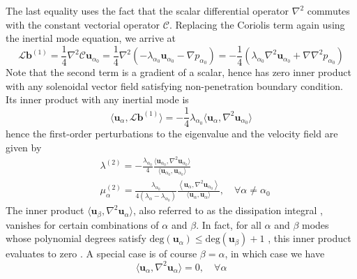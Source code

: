 %
The last equality uses the fact that the scalar differential operator $\nabla^2$ commutes with the constant vectorial operator $\mathcal{C}$. Replacing the Coriolis term again using the inertial mode equation, we arrive at
%
\begin{equation}\label{eqn:Lorentz-order1-ideal}
    \mathcal{L} \mathbf{b}^{(1)} = \frac{1}{4} \nabla^2 \mathcal{C} \mathbf{u}_{\alpha_0} = \frac{1}{4} \nabla^2 \left(- \lambda_{\alpha_0} \mathbf{u}_{\alpha_0} - \nabla p_{\alpha_0}\right) = - \frac{1}{4} \left(\lambda_{\alpha_0} \nabla^2 \mathbf{u}_{\alpha_0} + \nabla \nabla^2 p_{\alpha_0}\right)
\end{equation}
%
Note that the second term is a gradient of a scalar, hence has zero inner product with any solenoidal vector field satisfying non-penetration boundary condition. Its inner product with any inertial mode is
%
\begin{equation}
    \langle \mathbf{u}_{\alpha}, \mathcal{L} \mathbf{b}^{(1)} \rangle = - \frac{1}{4} \lambda_{\alpha_0} \langle  \mathbf{u}_{\alpha}, \nabla^2 \mathbf{u}_{\alpha_0} \rangle
\end{equation}
%
hence the first-order perturbations to the eigenvalue and the velocity field are given by
%
\begin{align}
    &\lambda^{(2)} = -\frac{\lambda_{\alpha_0}}{4} \frac{\langle \mathbf{u}_{\alpha_0}, \nabla^2 \mathbf{u}_{\alpha_0} \rangle}{\langle \mathbf{u}_{\alpha_0}, \mathbf{u}_{\alpha_0} \rangle}
    \\
    &\mu_\alpha^{(2)} = \frac{\lambda_{\alpha_0}}{4(\lambda_\alpha - \lambda_{\alpha_0})} \frac{\left\langle \mathbf{u}_{\alpha}, \nabla^2 \mathbf{u}_{\alpha_0} \right\rangle}{\langle \mathbf{u}_{\alpha}, \mathbf{u}_{\alpha} \rangle},\quad \forall \alpha \neq \alpha_0
\end{align}
%
The inner product $\langle \mathbf{u}_\beta, \nabla^2 \mathbf{u}_\alpha \rangle$, also referred to as the dissipation integral \citep{zhang_theory_2017}, vanishes for certain combinations of $\alpha$ and $\beta$. In fact, for all $\alpha$ and $\beta$ modes whose polynomial degrees satisfy $\mathrm{deg} (\mathbf{u}_\alpha) \leq \mathrm{deg} (\mathbf{u}_\beta) + 1$ \citep[inertial modes are all band-limited polynomials, ][]{zhang_theory_2017}, this inner product evaluates to zero \citep{ivers_enumeration_2015,zhang_theory_2017}. A special case is of course $\beta = \alpha$, in which case we have
%
\begin{equation}
    \langle \mathbf{u}_{\alpha}, \nabla^2 \mathbf{u}_{\alpha} \rangle = 0, \quad \forall \alpha
\end{equation}
